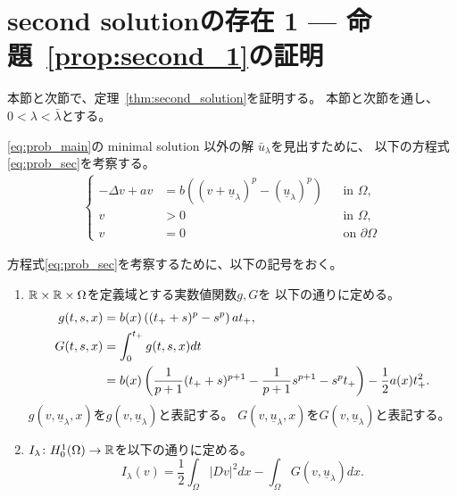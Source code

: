 \section{second solutionの存在 1 --- 命題~\ref{prop:second_1}の証明}

本節と次節で、定理~\ref{thm:second_solution}を証明する。
本節と次節を通し、$0 < \lambda < \bar{\lambda}$とする。

\ref{eq:prob_main}の minimal solution 以外の解
$\bar{u}_\lambda$を見出すために、
以下の方程式\ref{eq:prob_sec}を考察する。
\begin{align}
 \left\{
 \begin{aligned}
   -\Delta v + a v &= b \left( (v + \underline{u}_\lambda)^p - (\underline{u}_\lambda)^p \right)
  & &\text{in~} \Omega, \\
  v &> 0 & &\text{in~} \Omega, \\
  v &= 0 & &\text{on~} \partial\Omega
 \end{aligned}
 \right. \tag*{$(\heartsuit)_\lambda$} \label{eq:prob_sec}
\end{align}

方程式\ref{eq:prob_sec}を考察するために、以下の記号をおく。

\begin{nota}
 \begin{enumerate}[1.]
  \item $\mathbb{R} \times \mathbb{R} \times \Omega$を定義域とする実数値関数$g, G$を
        以下の通りに定める。
        \begin{align}
         g(t, s, x) &= b(x) \left( (t_+ + s)^p - s^p \right) a t_+, 
         \label{eq:def_g} \\
         G(t, s, x) &= \int_0^{t_+} g(t, s, x) dt
         \notag \\
         &= b(x) \left( \frac{1}{p+1} (t_+ + s)^{p+1} - \frac{1}{p+1}
         s^{p+1} - s^p t_+ \right) - \frac{1}{2} a(x) t_+^2.
         \label{eq:def_G}
        \end{align}
        $g(v, \underline{u}_\lambda, x)$を$g(v, \underline{u}_\lambda
        )$と表記する。
        $G(v,\underline{u}_\lambda, x)$を$G(v, \underline{u}_\lambda
        )$と表記する。
  \item $I_{\lambda} \colon H_0^1(\Omega) \to \mathbb{R}$を以下の通りに定める。
        \begin{equation}
         I_\lambda (v) = \frac{1}{2} \int_\Omega \lvert Dv \rvert^2 dx
          - \int_\Omega G(v, \underline{u}_\lambda) dx. \label{eq:def_I}
        \end{equation}
 \end{enumerate}
\end{nota}


